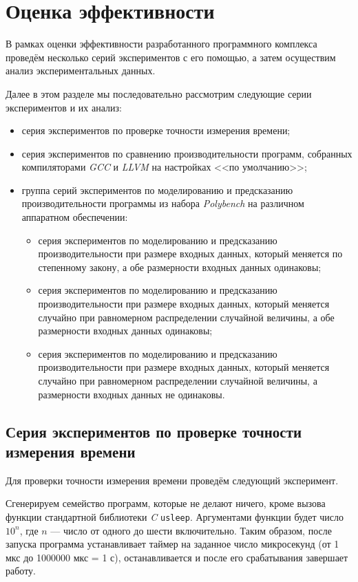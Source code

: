 \section{Оценка эффективности}
В рамках оценки эффективности разработанного программного комплекса проведём несколько серий экспериментов с его помощью, а затем осуществим анализ экспериментальных данных.

Далее в этом разделе мы последовательно рассмотрим следующие серии экспериментов и их анализ:
\begin{itemize}
    \item серия экспериментов по проверке точности измерения времени;
    \item серия экспериментов по сравнению производительности программ, собранных компиляторами \textit{GCC} и \textit{LLVM} на настройках <<по умолчанию>>;
    \item группа серий экспериментов по моделированию и предсказанию производительности программы из набора \textit{Polybench} на различном аппаратном обеспечении:
    \begin{itemize}
        \item серия экспериментов по моделированию и предсказанию производительности при размере входных данных, который меняется по степенному закону, а обе размерности входных данных одинаковы;
        \item серия экспериментов по моделированию и предсказанию производительности при размере входных данных, который меняется случайно при равномерном распределении случайной величины, а обе размерности входных данных одинаковы;
        \item серия экспериментов по моделированию и предсказанию производительности при размере входных данных, который меняется случайно при равномерном распределении случайной величины, а размерности входных данных не одинаковы.
    \end{itemize}
\end{itemize}

\subsection{Серия экспериментов по проверке точности измерения времени}
\label{ssec:series-accuracy}
Для проверки точности измерения времени проведём следующий эксперимент.

Сгенерируем семейство программ, которые не делают ничего, кроме вызова функции стандартной библиотеки \textit{C} \texttt{usleep}. Аргументами функции будет число $10^n$, где $n$ --- число от одного до шести включительно. Таким образом, после запуска программа устанавливает таймер на заданное число микросекунд (от 1 мкс до 1000000 мкс = 1 с), останавливается и после его срабатывания завершает работу.

